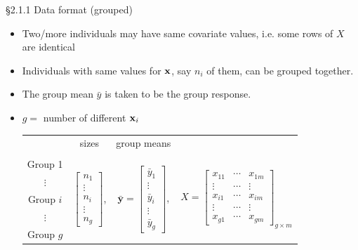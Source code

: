 \documentclass{beamer}
\begin{document}
\begin{frame}{\S2.1.1 Data format (grouped)}
\begin{itemize}
\item 
Two/more individuals may have same covariate values, i.e. some rows of $X$ are identical

\item Individuals with  same values for $\bf x$, say $n_i$ of them,  can be grouped together.

\item The group mean $\bar{y}$  is taken to be the group response. 


\item $g = $ number of different ${\bf x}_i$
\ \



\begin{center}
\begin{tabular}{cccc}
& sizes & group means &  \\ \\
Group 1 &  \multirow{5}{*}{$\left[\begin{array}{c} n_1 \\ \vdots \\ n_i \\ \vdots \\ n_g\end{array}\right]$,} 
& \multirow{5}{*}{$\bar{\textbf{y}}=\left[\begin{array}{c} \bar{y}_1 \\ \vdots \\ \bar{y}_i \\ \vdots 
\\ \bar{y}_g\end{array}\right]$,} & \multirow{5}{*}{$X=\left[\begin{array}{ccc} x_{11} & \cdots & x_{1m} \\ 
\vdots & \cdots & \vdots \\ x_{i1} & \cdots & x_{im} \\ \vdots & \cdots & \vdots \\ x_{g1} & \cdots & x_{gm}
\end{array}\right]_{g\times m}$} \\ $\vdots$ & & & \\ Group $i$ & & & \\ $\vdots$ & & & \\ Group $g$ & & &
\end{tabular}
\end{center}

\end{itemize}
\end{frame}
\end{document}
